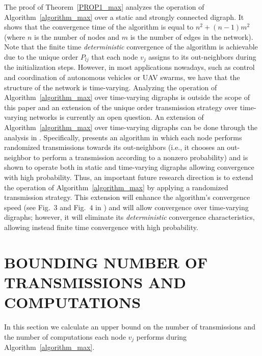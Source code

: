 \documentclass[twocolumn]{autart}    %
\begin{document}
The proof of Theorem~\ref{PROP1_max} analyzes the operation of Algorithm~\ref{algorithm_max} over a static and strongly connected digraph. 
It shows that the convergence time of the algorithm is equal to $n^2 + (n-1)m^2$ (where $n$ is the number of nodes and $m$ is the number of edges in the network). 
Note that the finite time \textit{deterministic} convergence of the algorithm is achievable due to the unique order $P_{lj}$ that each node $v_j$ assigns to its out-neighbors during the initialization steps. 
However, in most applications nowadays, such as control and coordination of autonomous vehicles or UAV swarms, we have that the structure of the network is time-varying. 
Analyzing the operation of Algorithm~\ref{algorithm_max} over time-varying digraphs is outside the scope of this paper and an extension of the unique order transmission strategy over time-varying networks is currently an open question. 
An extension of Algorithm~\ref{algorithm_max} over time-varying digraphs can be done through the analysis in \cite{2021:Rikos_Hadj_Splitting}. 
Specifically, \cite{2021:Rikos_Hadj_Splitting} presents an algorithm in which each node performs randomized transmissions towards its out-neighbors (i.e., it chooses an out-neighbor to perform a transmission according to a nonzero probability) and is shown to operate both in static and time-varying digraphs allowing convergence with high probability. 
Thus, an important future research direction is to extend the operation of Algorithm~\ref{algorithm_max} by applying a randomized transmission strategy. 
This extension will enhance the algorithm's convergence speed (see Fig.~$3$ and Fig.~$4$ in \cite{2021:Rikos_Hadj_Splitting}) and will allow convergence over time-varying digraphs; however, it will eliminate its \textit{deterministic} convergence characteristics, allowing instead finite time convergence with high probability. 





\section{BOUNDING NUMBER OF TRANSMISSIONS AND COMPUTATIONS}\label{bound_trans_comp}

In this section we calculate an upper bound on the number of transmissions and the number of computations each node $v_j$ performs during Algorithm~\ref{algorithm_max}. 

\end{document}
